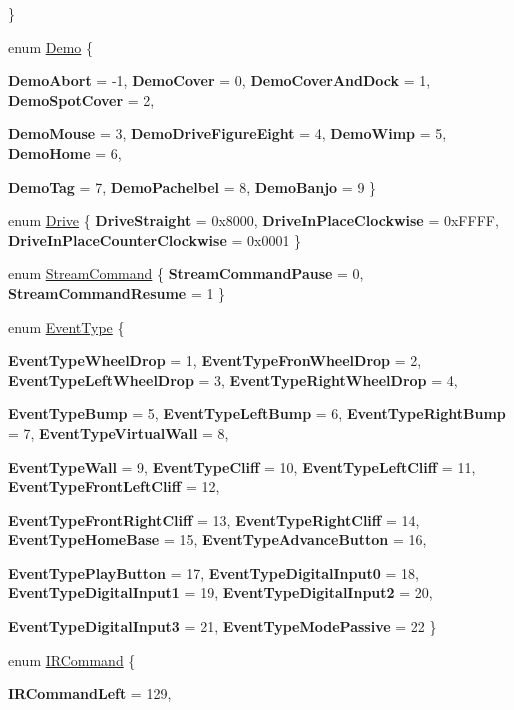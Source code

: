 \begin{DoxyCompactItemize}
 \}
\item 
enum \hyperlink{namespaceroomba_masks_a7e1411202b98dcb794a4d43593c73e71}{Demo} \{ \par
{\bfseries DemoAbort} =  -\/1, 
{\bfseries DemoCover} =  0, 
{\bfseries DemoCoverAndDock} =  1, 
{\bfseries DemoSpotCover} =  2, 
\par
{\bfseries DemoMouse} =  3, 
{\bfseries DemoDriveFigureEight} =  4, 
{\bfseries DemoWimp} =  5, 
{\bfseries DemoHome} =  6, 
\par
{\bfseries DemoTag} =  7, 
{\bfseries DemoPachelbel} =  8, 
{\bfseries DemoBanjo} =  9
 \}
\item 
enum \hyperlink{namespaceroomba_masks_a66506fb37d03bb0332fc796c2018346b}{Drive} \{ {\bfseries DriveStraight} =  0x8000, 
{\bfseries DriveInPlaceClockwise} =  0xFFFF, 
{\bfseries DriveInPlaceCounterClockwise} =  0x0001
 \}
\item 
enum \hyperlink{namespaceroomba_masks_aca4085268dd02bb55133f0ec380bf70d}{StreamCommand} \{ {\bfseries StreamCommandPause} =  0, 
{\bfseries StreamCommandResume} =  1
 \}
\item 
enum \hyperlink{namespaceroomba_masks_ae0312bb70700bedf6fce9ef231933ecb}{EventType} \{ \par
{\bfseries EventTypeWheelDrop} =  1, 
{\bfseries EventTypeFronWheelDrop} =  2, 
{\bfseries EventTypeLeftWheelDrop} =  3, 
{\bfseries EventTypeRightWheelDrop} =  4, 
\par
{\bfseries EventTypeBump} =  5, 
{\bfseries EventTypeLeftBump} =  6, 
{\bfseries EventTypeRightBump} =  7, 
{\bfseries EventTypeVirtualWall} =  8, 
\par
{\bfseries EventTypeWall} =  9, 
{\bfseries EventTypeCliff} =  10, 
{\bfseries EventTypeLeftCliff} =  11, 
{\bfseries EventTypeFrontLeftCliff} =  12, 
\par
{\bfseries EventTypeFrontRightCliff} =  13, 
{\bfseries EventTypeRightCliff} =  14, 
{\bfseries EventTypeHomeBase} =  15, 
{\bfseries EventTypeAdvanceButton} =  16, 
\par
{\bfseries EventTypePlayButton} =  17, 
{\bfseries EventTypeDigitalInput0} =  18, 
{\bfseries EventTypeDigitalInput1} =  19, 
{\bfseries EventTypeDigitalInput2} =  20, 
\par
{\bfseries EventTypeDigitalInput3} =  21, 
{\bfseries EventTypeModePassive} =  22
 \}
\item 
enum \hyperlink{namespaceroomba_masks_a42c0f4dda7d15b88115f15513422547f}{IRCommand} \{ \par
{\bfseries IRCommandLeft} =  129, 

\end{DoxyCompactItemize}
